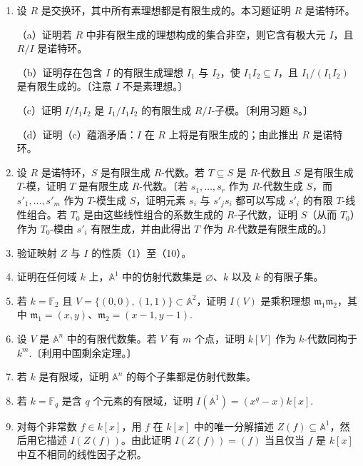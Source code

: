 \begin{enumerate}
\item 设 \(R\) 是交换环，其中所有素理想都是有限生成的。本习题证明 \(R\) 是诺特环。

（a）证明若 \(R\) 中非有限生成的理想构成的集合非空，则它含有极大元 \(I\)，且 \(R/I\) 是诺特环。

（b）证明存在包含 \(I\) 的有限生成理想 \(I_1\) 与 \(I_2\)，使 \(I_1I_2 \subseteq I\)，且 \(I_1/(I_1I_2)\) 是有限生成的。〔注意 \(I\) 不是素理想。〕

（c）证明 \(I/I_1I_2\) 是 \(I_1/I_1I_2\) 的有限生成 \(R/I\)-子模。〔利用习题 8。〕

（d）证明（c）蕴涵矛盾：\(I\) 在 \(R\) 上将是有限生成的；由此推出 \(R\) 是诺特环。

\item 设 \(R\) 是诺特环，\(S\) 是有限生成 \(R\)-代数。若 \(T \subseteq S\) 是 \(R\)-代数且 \(S\) 是有限生成 \(T\)-模，证明 \(T\) 是有限生成 \(R\)-代数。〔若 \(s_1, \ldots, s_r\) 作为 \(R\)-代数生成 \(S\)，而 \(s'_1, \ldots, s'_m\) 作为 \(T\)-模生成 \(S\)，证明元素 \(s_i\) 与 \(s'_js_i\) 都可以写成 \(s'_i\) 的有限 \(T\)-线性组合。若 \(T_0\) 是由这些线性组合的系数生成的 \(R\)-子代数，证明 \(S\)（从而 \(T_0\)）作为 \(T_0\)-模由 \(s'_i\) 有限生成，并由此得出 \(T\) 作为 \(R\)-代数是有限生成的。〕

\item 验证映射 \(Z\) 与 \(I\) 的性质（1）至（10）。

\item 证明在任何域 \(k\) 上，\(\mathbb{A}^1\) 中的仿射代数集是 \(\varnothing\)、\(k\) 以及 \(k\) 的有限子集。

\item 若 \(k = \mathbb{F}_2\) 且 \(V = \{(0,0), (1,1)\} \subset \mathbb{A}^2\)，证明 \(I(V)\) 是乘积理想 \(\mathfrak{m}_1\mathfrak{m}_2\)，其中 \(\mathfrak{m}_1 = (x,y)\)、\(\mathfrak{m}_2 = (x-1, y-1)\).

\item 设 \(V\) 是 \(\mathbb{A}^n\) 中的有限代数集。若 \(V\) 有 \(m\) 个点，证明 \(k[V]\) 作为 \(k\)-代数同构于 \(k^m\).〔利用中国剩余定理。〕

\item 若 \(k\) 是有限域，证明 \(\mathbb{A}^n\) 的每个子集都是仿射代数集。

\item 若 \(k = \mathbb{F}_q\) 是含 \(q\) 个元素的有限域，证明 \(I(\mathbb{A}^1) = (x^q-x)k[x]\).

\item 对每个非常数 \(f \in k[x]\)，用 \(f\) 在 \(k[x]\) 中的唯一分解描述 \(Z(f) \subseteq \mathbb{A}^1\)，然后用它描述 \(I(Z(f))\)。由此证明 \(I(Z(f)) = (f)\) 当且仅当 \(f\) 是 \(k[x]\) 中互不相同的线性因子之积。


\end{enumerate}
